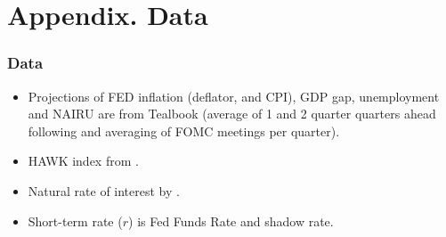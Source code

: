 \documentclass[10pt,aspectratio=169]{beamer}
\begin{document}





\lastslide





\appendix
\section{Appendix. Data}

\begin{frame}[label=backupSlide]\frametitle{Data}
    \begin{itemize}\setlength\itemsep{1em}
        \item Projections of FED inflation (deflator, and CPI), GDP gap, unemployment and NAIRU are from Tealbook {\color{gray}
        (average of 1 and 2 quarter quarters ahead following \cite{CoibionGorodnichenko2011} and averaging of FOMC meetings per quarter).}
        \item HAWK index from \cite{HIM2023}.
        \item Natural rate of interest by \cite{HLW2017,HLW2023}.
        \item Short-term rate ($r$) is Fed Funds Rate and \cite{WuXia2016} shadow rate.
        \end{itemize}
    \end{frame}
\end{document}
